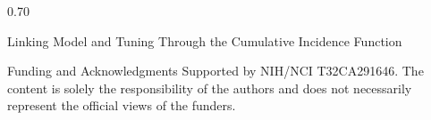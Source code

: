 \documentclass[final]{beamer}
\begin{document}
\begin{frame}[t]
\begin{columns}[t, onlytextwidth]
\begin{column}{0.70\textwidth}
\begin{block}{Linking Model and Tuning Through the Cumulative Incidence Function}
\end{block}

\begin{block}{Funding and Acknowledgments}
Supported by NIH/NCI T32CA291646. The content is solely the responsibility of the authors and does not necessarily represent the official views of the funders.
\end{block}

\end{column} %
\end{columns}

\end{frame}
\end{document}
